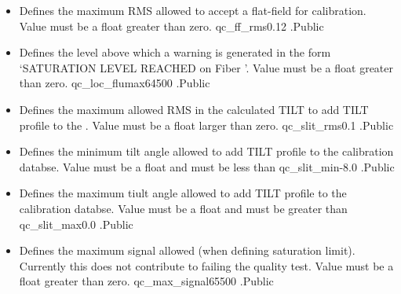 \begin{itemize}
\item {}
{Defines the maximum RMS allowed to accept a flat-field for calibration. Value must be a float greater than zero.}
{qc\_ff\_rms}{0.12}
{\calFFraw}{\constantsfile}{\calFFraw.\progMAIN}{Public}

\item {}
{Defines the level above which a warning is generated in the form `SATURATION LEVEL REACHED on Fiber '. Value must be a float greater than zero.}
{qc\_loc\_flumax}{64500}
{\calFFraw}{\constantsfile}{\calFFraw.\progMAIN}{Public}

\item {}
{Defines the maximum allowed RMS in the calculated TILT to add TILT profile to the \calibdb. Value must be a float larger than zero.}
{qc\_slit\_rms}{0.1}
{\calSLIT}{\constantsfile}{\calSLIT.\progMAIN}{Public}

\item {} 
{Defines the minimum tilt angle allowed to add TILT profile to the calibration databse. Value must be a float and must be less than }
{qc\_slit\_min}{-8.0}
{\calSLIT}{\constantsfile}{\calSLIT.\progMAIN}{Public}

\item {} 
{Defines the maximum tiult angle allowed to add TILT profile to the calibration databse. Value must be a float and must be greater than }
{qc\_slit\_max}{0.0}
{\calSLIT}{\constantsfile}{\calSLIT.\progMAIN}{Public}

\item {} 
{Defines the maximum signal allowed (when defining saturation limit). Currently this does not contribute to failing the quality test. Value must be a float greater than zero.}
{qc\_max\_signal}{65500}
{\calextractRAW}{\constantsfile}{\calextractRAW.\progMAIN}{Public}


\end{itemize}







